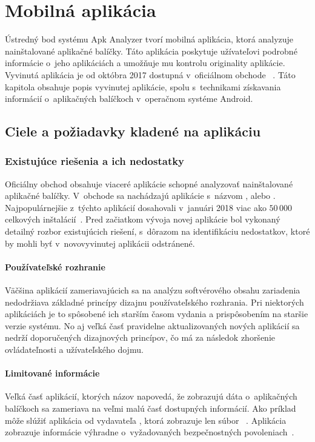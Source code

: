 \chapter{Mobilná aplikácia}
\label{chap:mobilna-aplikacia}

Ústredný bod systému Apk Analyzer tvorí mobilná aplikácia, ktorá analyzuje nainštalované aplikačné balíčky. Táto aplikácia poskytuje užívateľovi podrobné informácie o~jeho aplikáciách a umožňuje mu kontrolu originality aplikácie. Vyvinutá aplikácia je od októbra 2017 dostupná v~oficiálnom obchode ~\cite{gp}. Táto kapitola obsahuje popis vyvinutej aplikácie, spolu s~technikami získavania informácií o~aplikačných balíčkoch v~operačnom systéme Android.

\section{Ciele a požiadavky kladené na aplikáciu}
\subsection{Existujúce riešenia a ich nedostatky}
Oficiálny obchod  obsahuje viaceré aplikácie schopné analyzovať nainštalované aplikačné balíčky. V~obchode sa nachádzajú aplikácie s~názvom ,  alebo . Najpopulárnejšie z~týchto aplikácií dosahovali v~januári 2018 viac ako $50\,000$ celkových inštalácií~\cite{kfOvdBmwje56iW6j}. Pred začiatkom vývoja novej aplikácie bol vykonaný detailný rozbor existujúcich riešení, s~dôrazom na identifikáciu nedostatkov, ktoré by mohli byť v~novovyvinutej aplikácii odstránené.
\subsubsection{\textbf{Používateľské rozhranie}}
Väčšina aplikácií zameriavajúcich sa na analýzu softvérového obsahu zariadenia nedodržiava základné princípy dizajnu používateľského rozhrania. Pri niektorých aplikáciách je to spôsobené ich starším časom vydania a prispôsobením na staršie verzie systému. No aj veľká časť pravidelne aktualizovaných nových aplikácií sa nedrží doporučených dizajnových princípov, čo má za následok zhoršenie ovládateľnosti a užívateľského dojmu.

\subsubsection{\textbf{Limitované informácie}}
Veľká časť aplikácií, ktorých názov napovedá, že zobrazujú dáta o~aplikačných balíčkoch sa zameriava na veľmi malú časť dostupných informácií. Ako príklad môže slúžiť aplikácia  od vydavateľa , ktorá zobrazuje len súbor ~\cite{kfOvdBmwje56iW6i}. Aplikácia  zobrazuje informácie výhradne o~vyžadovaných bezpečnostných povoleniach~\cite{kfOvdBmwje56iW6i}.


